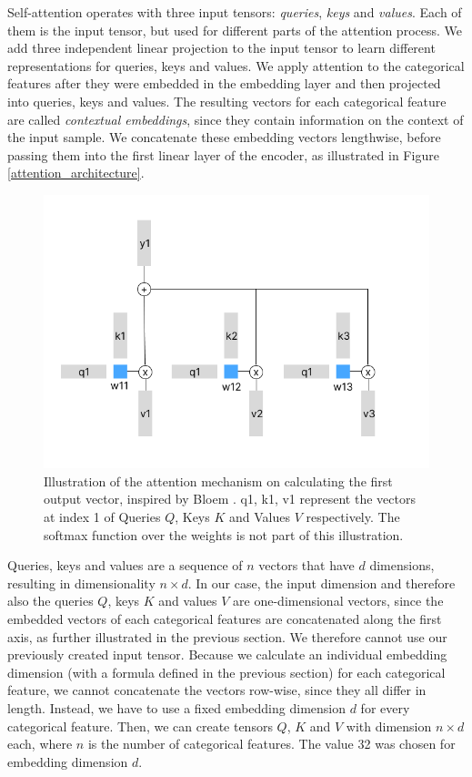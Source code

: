 Self-attention operates with three input tensors: \textit{queries}, \textit{keys} and \textit{values}. Each of them is the input tensor, but used for different parts of the attention process. We add three independent linear projection to the input tensor to learn different representations for queries, keys and values. We apply attention to the categorical features after they were embedded in the embedding layer and then projected into queries, keys and values. The resulting vectors for each categorical feature are called \textit{contextual embeddings}, since they contain information on the context of the input sample. We concatenate these embedding vectors lengthwise, before passing them into the first linear layer of the encoder, as illustrated in Figure \ref{attention_architecture}.

\begin{figure}
\centering
	\includegraphics[width=1.1\linewidth]{attention_illustrated.png}
	\caption{Illustration of the attention mechanism on calculating the first output vector, inspired by Bloem \cite{transformers_from_scratch}. q1, k1, v1 represent the vectors at index 1 of Queries $Q$, Keys $K$ and Values $V$ respectively. The softmax function over the weights is not part of this illustration.}
	\label{attention_illustrated}
\end{figure}

Queries, keys and values are a sequence of $n$ vectors that have $d$ dimensions, resulting in dimensionality $n \times d$. In our case, the input dimension and therefore also the queries $Q$, keys $K$ and values $V$ are one-dimensional vectors, since the embedded vectors of each categorical features are concatenated along the first axis, as further illustrated in the previous section. We therefore cannot use our previously created input tensor. Because we calculate an individual embedding dimension (with a formula defined in the previous section) for each categorical feature, we cannot concatenate the vectors row-wise, since they all differ in length. Instead, we have to use a fixed embedding dimension $d$ for every categorical feature. Then, we can create tensors $Q$, $K$ and $V$ with dimension $n \times d$ each, where $n$ is the number of categorical features. The value 32 was chosen for embedding dimension $d$.

